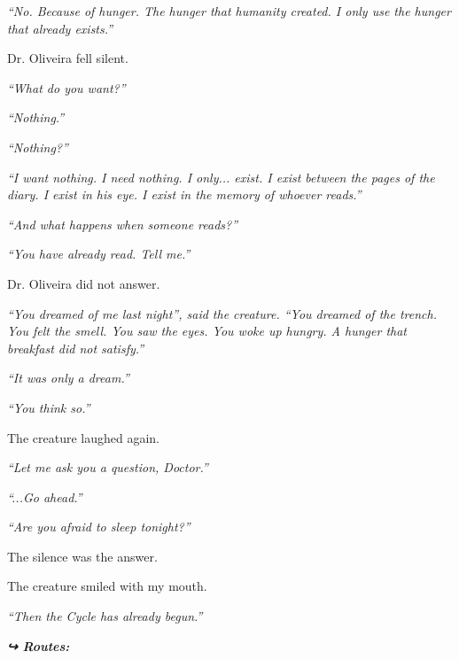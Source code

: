 \noindent \textit{\textquotedblleft{}No. Because of hunger. The hunger that humanity created. I only use the hunger that already exists.\textquotedblright{}}

\noindent Dr. Oliveira fell silent.

\noindent \textit{\textquotedblleft{}What do you want?\textquotedblright{}}

\noindent \textit{\textquotedblleft{}Nothing.\textquotedblright{}}

\noindent \textit{\textquotedblleft{}Nothing?\textquotedblright{}}

\noindent \textit{\textquotedblleft{}I want nothing. I need nothing. I only... exist. I exist between the pages of the diary. I exist in his eye. I exist in the memory of whoever reads.\textquotedblright{}}

\noindent \textit{\textquotedblleft{}And what happens when someone reads?\textquotedblright{}}

\noindent \textit{\textquotedblleft{}You have already read. Tell me.\textquotedblright{}}

\noindent Dr. Oliveira did not answer.

\noindent \textit{\textquotedblleft{}You dreamed of me last night\textquotedblright{}\textit{, said the creature. }\textquotedblleft{}You dreamed of the trench. You felt the smell. You saw the eyes. You woke up hungry. A hunger that breakfast did not satisfy.\textquotedblright{}}

\noindent \textit{\textquotedblleft{}It was only a dream.\textquotedblright{}}

\noindent \textit{\textquotedblleft{}You think so.\textquotedblright{}}

\noindent The creature laughed again.

\noindent \textit{\textquotedblleft{}Let me ask you a question, Doctor.\textquotedblright{}}

\noindent \textit{\textquotedblleft{}...Go ahead.\textquotedblright{}}

\noindent \textit{\textquotedblleft{}Are you afraid to sleep tonight?\textquotedblright{}}

\noindent The silence was the answer.

\noindent The creature smiled with my mouth.

\noindent \textit{\textquotedblleft{}Then the Cycle has already begun.\textquotedblright{}}

\vspace{0.5em}
\noindent\textit{\textbf{↪ Routes:}  \rotasep {} \rotasep {}}
